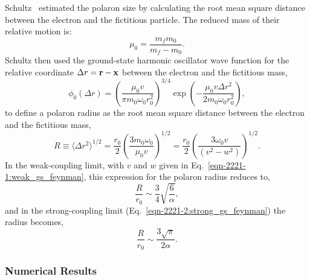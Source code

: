 Schultz~\cite{schultz_slow_1959} estimated the polaron size by calculating the root mean square distance between the electron and the fictitious particle. The reduced mass of their relative motion is:
\begin{equation}
    \mu_0 = \frac{m_f m_0}{m_f - m_0}.
\label{eqn-2222-5:reduced_mass_schultz}
\end{equation}
Schultz then used the ground-state harmonic oscillator wave function for the relative coordinate $\Delta r = \vb{r} - \vb{x}$ between the electron and the fictitious mass,
\begin{equation}
    \phi_0(\Delta r) = \left(\frac{\mu_0 v}{\pi m_0 \omega_0 r_0^2} \right)^{3/4} \exp\left( -\frac{\mu_0 v \Delta r^2}{2m_0 \omega_0 r_0^2} \right),
\label{eqn-2222-7:gs_wavefunction_schultz}
\end{equation}
to define a polaron radius as the root mean square distance between the electron and the fictitious mass,
\begin{equation}
    R \equiv \langle \Delta r^2 \rangle^{1/2} = \frac{r_0}{2} \left(\frac{3 m_0 \omega_0}{\mu_0 v}\right)^{1/2} = \frac{r_0}{2} \left( \frac{3 \omega_0 v}{(v^2 - w^2)} \right)^{1/2}.
\label{eqn-2222-8:polaron_size_schultz}
\end{equation}
In the weak-coupling limit, with $v$ and $w$ given in Eq.~\ref{eqn-2221-1:weak_gs_feynman}, this expression for the polaron radius reduces to,
\begin{equation}
    \frac{R}{r_0} \sim \frac{3}{4} \sqrt{\frac{6}{\alpha}},
\label{eqn-2222-9:weak_polaron_size_schultz}
\end{equation}
and in the strong-coupling limit (Eq.~\ref{eqn-2221-2:strong_gs_feynman}) the radius becomes,
\begin{equation}
    \frac{R}{r_0} \sim \frac{3 \sqrt{\pi}}{2\alpha}.
\label{eqn-2222-10:strong_polaron_size_schultz}
\end{equation}

\subsubsection{Numerical Results}
\label{subsubsec:2-2-5-1}

